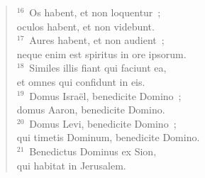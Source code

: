 \begin{verse}
${}^{16}$~Os habent, et non loquentur~;\\ oculos habent, et non videbunt.\\
${}^{17}$~Aures habent, et non audient~;\\ neque enim est spiritus in ore ipsorum.\\
${}^{18}$~Similes illis fiant qui faciunt ea,\\ et omnes qui confidunt in eis.\\
${}^{19}$~Domus Isra\"el, benedicite Domino~;\\ domus Aaron, benedicite Domino.\\
${}^{20}$~Domus Levi, benedicite Domino~;\\ qui timetis Dominum, benedicite Domino.\\
${}^{21}$~Benedictus Dominus ex Sion,\\ qui habitat in Jerusalem.\end{verse}



